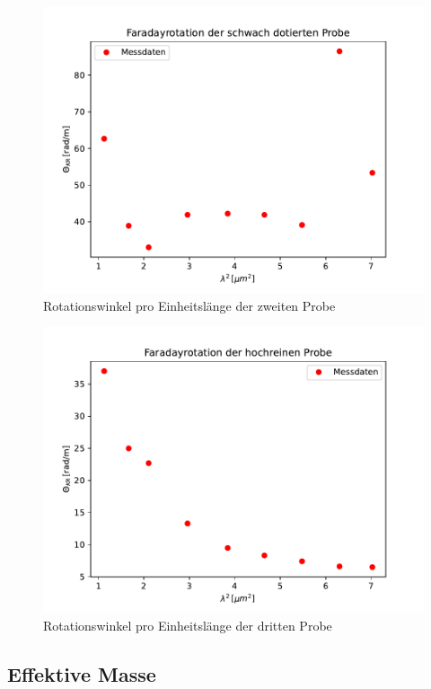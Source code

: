 \begin{figure}
\includegraphics{content/grafiken/probe2erstes.pdf}
\caption{Rotationswinkel pro Einheitslänge der zweiten Probe}
\label{fig:probe2}
\end{figure}

\begin{figure}
\includegraphics{content/grafiken/probe3erstes.pdf}
\caption{Rotationswinkel pro Einheitslänge der dritten Probe}
\label{fig:probe3}
\end{figure}



\clearpage


\subsection{Effektive Masse}

